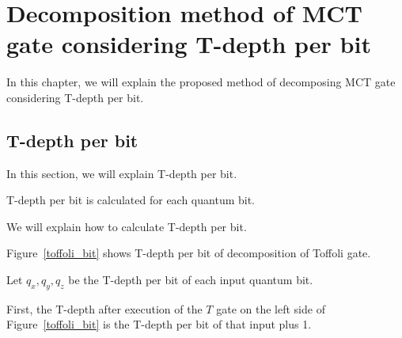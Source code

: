 \section{Decomposition method of MCT gate considering T-depth per bit}
In this chapter, we will explain the proposed method of decomposing MCT gate considering T-depth per bit.

\subsection{T-depth per bit}
In this section, we will explain T-depth per bit.

T-depth per bit is calculated for each quantum bit.

\par
We will explain how to calculate T-depth per bit.

Figure~\ref{toffoli_bit}
shows T-depth per bit of decomposition of Toffoli gate.

Let $q_{x}, q_{y}, q_{z}$ be the T-depth per bit of each input quantum bit.

First, the T-depth after execution of the $T$ gate on the left side of Figure~\ref{toffoli_bit}
is the T-depth per bit of that input plus 1.

